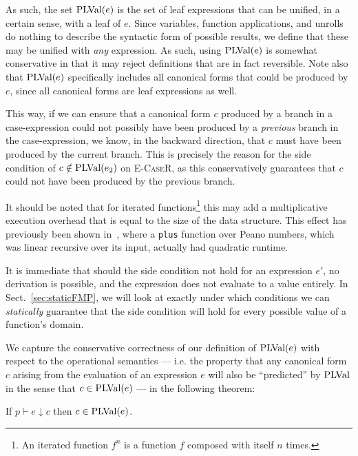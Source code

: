As such, the set $\text{PLVal}(e)$ is the set of leaf expressions that can be
unified, in a certain sense, with a leaf of $e$. Since variables, function
applications, and unrolls do nothing to describe the syntactic form of possible
results, we define that these may be unified with \emph{any} expression. As
such, using $\text{PLVal}(e)$ is somewhat conservative in that it may reject
definitions that are in fact reversible. Note also that $\text{PLVal}(e)$
specifically includes all canonical forms that could be produced by $e$, since
all canonical forms are leaf expressions as well.

This way, if we can ensure that a canonical form $c$ produced by a branch in
a case-expression could not possibly have been produced by a \emph{previous}
branch in the case-expression, we know, in the backward direction, that $c$
must have been produced by the current branch. This is precisely the reason for
the side condition of $c \notin \text{PLVal}(e_2)$ on \textsc{E-CaseR}, as this
conservatively guarantees that $c$ could not have been produced by the previous
branch.

It should be noted that for iterated functions\footnote{An iterated function
$f^n$ is a function $f$ composed with itself $n$ times.} this may add a
multiplicative execution overhead that is equal to the size of the data
structure. This effect has previously been shown in~\cite{Thomsen:2012:FDL},
where a \lstinline{plus} function over Peano numbers, which was linear
recursive over its input, actually had quadratic runtime.

It is immediate that should the side condition not hold for an expression $e'$,
no derivation is possible, and the expression does not evaluate to a value
entirely. In Sect.~\ref{sec:staticFMP}, we will look at exactly under which
conditions we can \emph{statically} guarantee that the side condition will hold
for every possible value of a function's domain.

We capture the conservative correctness of our definition of $\text{PLVal}(e)$ with
respect to the operational semantics --- i.e. the property that any
canonical form $c$ arising from the evaluation of an expression $e$ will also
be ``predicted'' by $\text{PLVal}$ in the sense that $c \in \text{PLVal}(e)$ --- in the
following theorem:

\begin{theorem}
  If $p \vdash e \downarrow c$ then $c \in \text{PLVal}(e)$.
\end{theorem}

